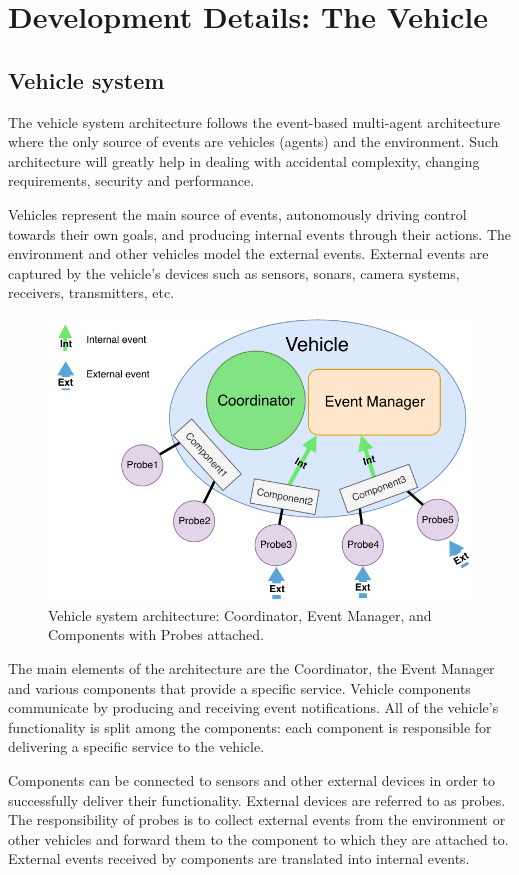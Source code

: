 \documentclass{memoir}
\begin{document}
\section{Development Details: The Vehicle}

\subsection{Vehicle system}

The vehicle system architecture follows the event-based multi-agent architecture where the only source of events are vehicles (agents) and the environment.
Such architecture will greatly help in dealing with accidental complexity, changing requirements, security and performance.


Vehicles represent the main source of events, autonomously driving control towards their own goals, and producing internal events through their actions.
The environment and other vehicles model the external events. External events are captured by the vehicle's devices such as sensors, sonars, camera systems, receivers, transmitters, etc.

\begin{figure}
	\centering
	\includegraphics[width=0.7\linewidth]{implementation_details/vehicle_high-level_architecture.pdf}
	\caption{Vehicle system architecture: Coordinator, Event Manager, and Components with Probes attached.}
	\label{fig:vehicle-architecture}
\end{figure}

The main elements of the architecture are the Coordinator, the Event Manager and various components that provide a specific service.
Vehicle components communicate by producing and receiving event notifications. All of the vehicle's functionality is split among the components: each component is responsible for delivering a specific service to the vehicle.

Components can be connected to sensors and other external devices in order to successfully deliver their functionality. External devices are referred to as probes.
The responsibility of probes is to collect external events from the environment or other vehicles and forward them to the component to which they are attached to.
External events received by components are translated into internal events.
\end{document}
